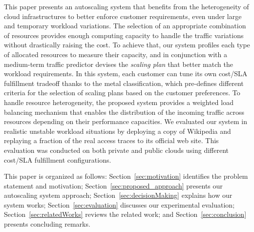 This paper presents an autoscaling system that benefits from the
heterogeneity of cloud infrastructures to better enforce customer
requirements, even under large and temporary workload variations. The
selection of an appropriate combination of resources provides enough
computing capacity to handle the traffic variations without
drastically raising the cost. To achieve that, our system profiles
each type of allocated resources to measure their capacity, and in
conjunction with a medium-term traffic predictor devises
the \emph{scaling plan} that better match the workload
requirements. In this system, each customer can tune its own cost/SLA
fulfillment tradeoff thanks to the metal classification, which
pre-defines different criteria for the selection of scaling plans
based on the customer preferences. To handle resource heterogeneity,
the proposed system provides a weighted load balancing mechanism that
enables the distribution of the incoming traffic across resources depending
on their performance capacities. We evaluated our system in realistic
unstable workload situations by deploying a copy of Wikipedia and
replaying a fraction of the real access traces to its official web
site. This evaluation was conducted on both private and public clouds
using different cost/SLA fulfillment configurations.

This paper is organized as follows: Section~\ref{sec:motivation} identifies the problem statement and
motivation; Section~\ref{sec:proposed_approach} presents our
autoscaling system approach; Section~\ref{sec:decisionMaking} explains
how our system works; Section~\ref{sec:evaluation} discusses
our experimental evaluation; Section~\ref{sec:relatedWorks} reviews
the related work; and Section~\ref{sec:conclusion} presents concluding
remarks.
